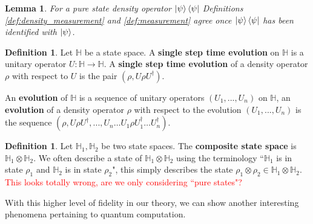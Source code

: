 \documentclass[12pt]{article}
\theoremstyle{plain}
\newtheorem{lemma}[thm]{Lemma}
\theoremstyle{definition}
\newtheorem{defn}[thm]{Definition} %
\newcommand{\bb}[1]{\mathbb{#1}}
\newcommand{\lto}{\longrightarrow}
\begin{document}
	\begin{lemma}
		For a pure state density operator $\ket{\psi}\bra{\psi}$ Definitions \ref{def:density_measurement} and \ref{def:measurement} agree once $\ket{\psi}\bra{\psi}$ has been identified with $\ket{\psi}$.
	\end{lemma}
	
	\begin{defn}
		Let $\bb{H}$ be a state space. A \textbf{single step time evolution} on $\bb{H}$ is a unitary operator $U: \bb{H} \lto \bb{H}$. A \textbf{single step time evolution} of a density operator $\rho$ with respect to $U$ is the pair $(\rho, U\rho U^\dagger)$.
		
		An \textbf{evolution} of $\bb{H}$ is a sequence of unitary operators $(U_1,...,U_n)$ on $\bb{H}$, an \textbf{evolution} of a density operator $\rho$ with respect to the evolution $(U_1,...,U_n)$ is the sequence $(\rho, U\rho U^\dagger, ..., U_n\hdots U_1 \rho U_1^\dagger \hdots U_n^\dagger)$.
	\end{defn}
	
	\begin{defn}
		Let $\bb{H}_1,\bb{H}_2$ be two state spaces. The \textbf{composite state space }is $\bb{H}_1 \otimes \bb{H}_2$. We often describe a state of $\bb{H}_1 \otimes \bb{H}_2$ using the terminology ``$\bb{H}_1$ is in state $\rho_1$ and $\bb{H}_2$ is in state $\rho_2$",  this simply describes the state $\rho_1 \otimes \rho_2 \in \bb{H}_1 \otimes \bb{H}_2$. \textcolor{red}{This looks totally wrong, are we only considering ``pure states"?}
	\end{defn}
	
	With this higher level of fidelity in our theory, we can show another interesting phenomena pertaining to quantum computation.
	
\end{document}
